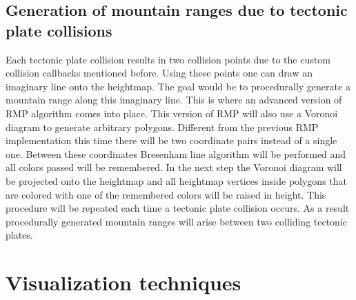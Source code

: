 \documentclass[11pt,a4paper,twoside,openright]{report}
\begin{document}
\subsection{Generation of mountain ranges due to tectonic plate collisions}
\label{subsec:generationofmountainranges}
Each tectonic plate collision results in two collision points due to the custom collision callbacks mentioned before. Using these points one can draw an imaginary line onto the heightmap. The goal would be to procedurally generate a mountain range along this imaginary line. This is where an advanced version of RMP algorithm comes into place. This version of RMP will also use a Voronoi diagram to generate arbitrary polygons. Different from the previous RMP implementation this time there will be two coordinate pairs instead of a single one. Between these coordinates Bresenham line algorithm will be performed and all colors passed will be remembered. In the next step the Voronoi diagram will be projected onto the heightmap and all heightmap vertices inside polygons that are colored with one of the remembered colors will be raised in height. This procedure will be repeated each time a tectonic plate collision occurs. As a result procedurally generated mountain ranges will arise between two colliding tectonic plates.

\section{Visualization techniques}
\end{document}
